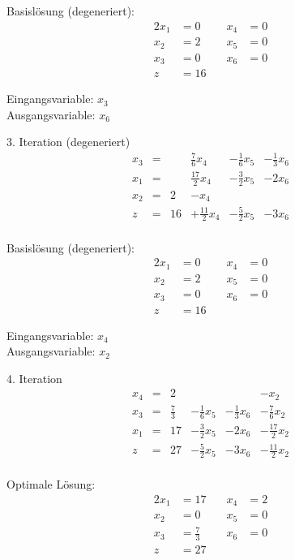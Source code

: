 \documentclass[a4paper]{scrartcl}
\begin{document}
\begin{enumerate}[label=\bfseries\arabic*.]
        Basislösung (degeneriert):
        \begin{alignat*}{2}
            x_1 &= 0 &\quad x_4 &= 0 \\
            x_2 &= 2 &\quad x_5 &= 0 \\
            x_3 &= 0 &\quad x_6 &= 0 \\
            z &= 16
        \end{alignat*}

        Eingangsvariable: $x_3$ \\
        Ausgangsvariable: $x_6$

        3. Iteration (degeneriert)
        \begin{equation}
            \begin{array}{rcrrrr}
                x_3 & = &   & \frac{7}{6}x_4 & -\frac{1}{6}x_5 & -\frac{1}{3}x_6 \\
                x_1 & = &   & \frac{17}{2}x_4 & -\frac{3}{2}x_5 & -2x_6 \\
                x_2 & = & 2 & -x_4 & & \\
                \hline
                z   & = & 16 & +\frac{11}{2}x_4 & -\frac{5}{2}x_5 & -3x_6\\
            \end{array}
        \end{equation}

        Basislösung (degeneriert):
        \begin{alignat*}{2}
            x_1 &= 0 &\quad x_4 &= 0 \\
            x_2 &= 2 &\quad x_5 &= 0 \\
            x_3 &= 0 &\quad x_6 &= 0 \\
            z &= 16
        \end{alignat*}

        Eingangsvariable: $x_4$ \\
        Ausgangsvariable: $x_2$

        4. Iteration
        \begin{equation}
            \begin{array}{rcrrrr}
                x_4 & = & 2 & & & -x_2 \\
                x_3 & = & \frac{7}{3} & -\frac{1}{6}x_5 & -\frac{1}{3}x_6 & -\frac{7}{6}x_2 \\
                x_1 & = & 17 & -\frac{3}{2}x_5 & -2x_6 & -\frac{17}{2}x_2 \\
                \hline
                z   & = & 27 & -\frac{5}{2}x_5 & -3x_6 & -\frac{11}{2}x_2\\
            \end{array}
        \end{equation}

        Optimale Lösung:
        \begin{alignat*}{2}
            x_1 &= 17 &\quad x_4 &= 2 \\
            x_2 &= 0 &\quad x_5 &= 0 \\
            x_3 &= \frac{7}{3} &\quad x_6 &= 0 \\
            z &= 27
        \end{alignat*}


\end{enumerate}
\end{document}
